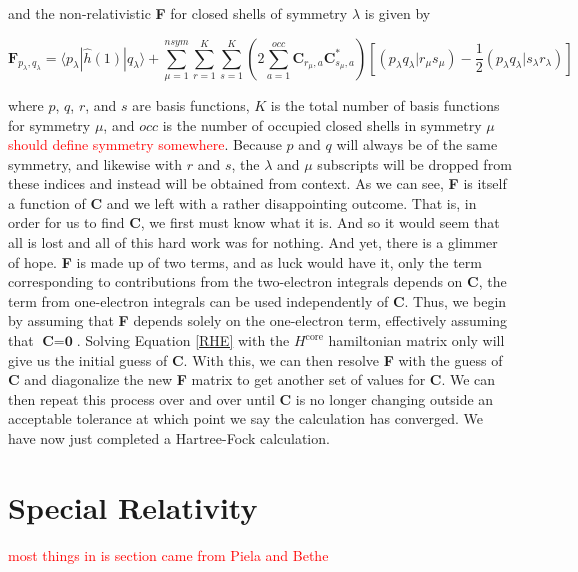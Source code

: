 \documentclass[12pt]{report}
\newcommand{\notetodylan}[1]{\textcolor{red}{#1}} %
\begin{document}
and the non-relativistic \textbf{F} for closed shells of symmetry $\lambda$ is given by

\begin{equation}
\label{FOCKM}
\textbf{F}_{p_{\lambda},q_{\lambda}} = \langle p_{\lambda}|\hat{h}(1)|q_{\lambda}\rangle + \sum^{nsym}_{\mu=1}\sum^{K}_{r=1}\sum^{K}_{s=1}\left( 2\sum^{occ}_{a=1}\textbf{C}_{r_{\mu},a}\textbf{C}^{*}_{s_{\mu}, a}\right)
				\left[\left( p_{\lambda}q_{\lambda}|r_{\mu}s_{\mu}\right) - \frac{1}{2}\left( p_{\lambda}q_{\lambda}|s_{\lambda}r_{\lambda}\right)\right]
\end{equation}

where $p$, $q$, $r$, and $s$ are basis functions, $K$ is the total number of basis functions for symmetry $\mu$, and $occ$ is the number of occupied closed shells in symmetry $\mu$ \notetodylan{should define symmetry somewhere}. Because $p$ and $q$ will always be of the same symmetry, and likewise with $r$ and $s$, the $\lambda$ and $\mu$ subscripts will be dropped from these indices and instead will be obtained from context. As we can see, \textbf{F} is itself a function of \textbf{C} and we left with a rather disappointing outcome. That is, in order for us to find \textbf{C}, we first must know what it is. And so it would seem that all is lost and all of this hard work was for nothing. And yet, there is a glimmer of hope. \textbf{F} is made up of two terms, and as luck would have it, only the term corresponding to contributions from the two-electron integrals depends on \textbf{C}, the term from one-electron integrals can be used independently of \textbf{C}. Thus, we begin by assuming that \textbf{F} depends solely on the one-electron term, effectively assuming that $\textbf{C}=\textbf{0}$. Solving Equation \ref{RHE} with the $H^{\text{core}}$ hamiltonian matrix only will give us the initial guess of \textbf{C}. With this, we can then resolve \textbf{F} with the guess of \textbf{C} and diagonalize the new \textbf{F} matrix to get another set of values for \textbf{C}. We can then repeat this process over and over until \textbf{C} is no longer changing outside an acceptable tolerance at which point we say the calculation has converged. We have now just completed a Hartree-Fock calculation.

\section{Special Relativity}
\notetodylan{most things in is section came from Piela and Bethe}
\end{document}
